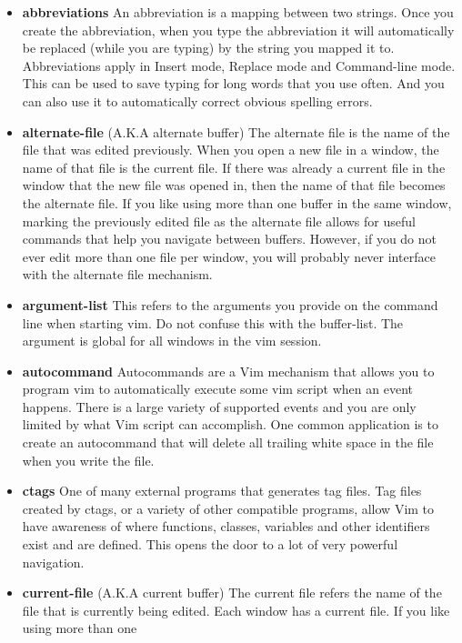 \documentclass[12pt, oneside]{book}
\begin{document}
\begin{itemize}[leftmargin=*, label={}]
  \item \textbf{abbreviations} An abbreviation is a mapping between two strings.  Once you create the abbreviation, when you type the abbreviation it will automatically be replaced (while you are
    typing) by the string you mapped it to.  Abbreviations apply in Insert mode, Replace mode and Command-line mode.  This can be used to save typing for long words that you use often.  And you can
    also use it to automatically correct obvious spelling errors.
  \item \textbf{alternate-file} (A.K.A alternate buffer) The alternate file is the name of the file that was edited previously.  When you open a new file in a window, the name of that file is the
    current file.  If there was already a current file in the window that the new file was opened in, then the name of that file becomes the alternate file.  If you like using more than one buffer in
    the same window, marking the previously edited file as the alternate file allows for useful commands that help you navigate between buffers.  However, if you do not ever edit more than one file
    per window, you will probably never interface with the alternate file mechanism.
  \item \textbf{argument-list} This refers to the arguments you provide on the command line when starting vim.  Do not confuse this with the buffer-list.  The argument is global for all windows in the
    vim session.
  \item \textbf{autocommand} Autocommands are a Vim mechanism that allows you to program vim to automatically execute some vim script when an event happens.  There is a large variety of supported
    events and you are only limited by what Vim script can accomplish.  One common application is to create an autocommand that will delete all trailing white space in the file when you
    write the file.
  \item \textbf{ctags} One of many external programs that generates tag files.  Tag files created by ctags, or a variety of other compatible programs, allow Vim to have awareness of where functions,
    classes, variables and other identifiers exist and are defined.  This opens the door to a lot of very powerful navigation.
  \item \textbf{current-file} (A.K.A current buffer) The current file refers the name of the file that is currently being edited.  Each window has a current file.  If you like using more than one

\end{itemize}
\end{document}
